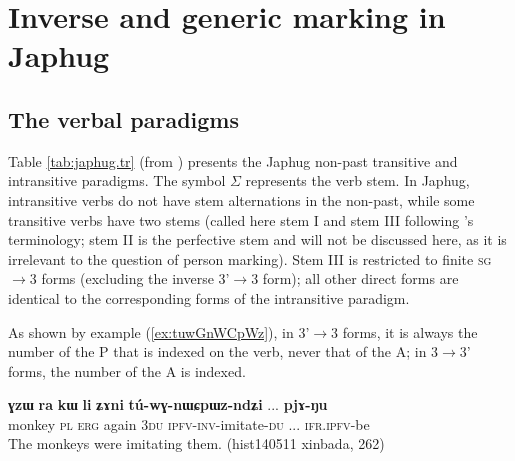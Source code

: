 \documentclass[oneside,a4paper,11pt]{article}
\newcommand{\ipa}[1]{\textbf{\phon\mbox{#1}}} %
\newcommand{\ro}{$\Sigma$}
\newcommand{\refb}[1]{(\ref{#1})}
\begin{document}
\section{Inverse and generic marking in Japhug} \label{sec:japhug}
\subsection{The verbal paradigms}
Table \ref{tab:japhug.tr} (from  \citealt{jacques10inverse}) presents the Japhug non-past transitive and intransitive paradigms. The symbol \ro{} represents the verb stem. In Japhug, intransitive verbs do not have stem alternations in the non-past, while some transitive verbs have two stems (called here stem I and stem III following \citealt{jackson00sidaba}'s terminology; stem II is the perfective stem and will not be discussed here, as it is irrelevant to the question of person marking). Stem III is restricted to finite \textsc{sg}$\rightarrow$3 forms (excluding the inverse 3'$\rightarrow$3 form); all other direct forms are identical to the corresponding forms of the intransitive paradigm.

As shown by example \refb{ex:tuwGnWCpWz}, in 3'$\rightarrow$3 forms, it is always the number of the P that is indexed on the verb, never that of the A; in 3$\rightarrow$3' forms, the number of the A is indexed.

\begin{exe}
\ex \label{ex:tuwGnWCpWz}
\gll 
\ipa{ɣzɯ} 	\ipa{ra} 	\ipa{kɯ} 	\ipa{li} 	\ipa{ʑɤni} 	\ipa{tú-wɣ-nɯɕpɯz-ndʑi} ... \ipa{pjɤ-ŋu} \\
monkey \textsc{pl} \textsc{erg} again \textsc{3du} \textsc{ipfv-inv}-imitate-\textsc{du} ... \textsc{ifr.ipfv}-be \\
 \glt The monkeys were imitating them.  (hist140511 xinbada, 262)
\end{exe}
\end{document}
